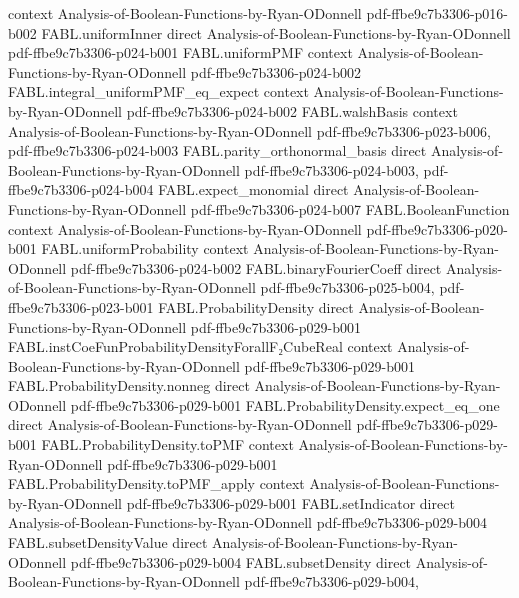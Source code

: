 \begin{theorem}
  {context}
  {Analysis-of-Boolean-Functions-by-Ryan-ODonnell}
  {pdf-ffbe9c7b3306-p016-b002}
\proofstep
  {FABL.uniformInner}
  {direct}
  {Analysis-of-Boolean-Functions-by-Ryan-ODonnell}
  {pdf-ffbe9c7b3306-p024-b001}
\proofstep
  {FABL.uniformPMF}
  {context}
  {Analysis-of-Boolean-Functions-by-Ryan-ODonnell}
  {pdf-ffbe9c7b3306-p024-b002}
\proofstep
  {FABL.integral_uniformPMF_eq_expect}
  {context}
  {Analysis-of-Boolean-Functions-by-Ryan-ODonnell}
  {pdf-ffbe9c7b3306-p024-b002}
\proofstep
  {FABL.walshBasis}
  {context}
  {Analysis-of-Boolean-Functions-by-Ryan-ODonnell}
  {pdf-ffbe9c7b3306-p023-b006,
    pdf-ffbe9c7b3306-p024-b003}
\proofstep
  {FABL.parity_orthonormal_basis}
  {direct}
  {Analysis-of-Boolean-Functions-by-Ryan-ODonnell}
  {pdf-ffbe9c7b3306-p024-b003,
    pdf-ffbe9c7b3306-p024-b004}
\proofstep
  {FABL.expect_monomial}
  {direct}
  {Analysis-of-Boolean-Functions-by-Ryan-ODonnell}
  {pdf-ffbe9c7b3306-p024-b007}
\proofstep
  {FABL.BooleanFunction}
  {context}
  {Analysis-of-Boolean-Functions-by-Ryan-ODonnell}
  {pdf-ffbe9c7b3306-p020-b001}
\proofstep
  {FABL.uniformProbability}
  {context}
  {Analysis-of-Boolean-Functions-by-Ryan-ODonnell}
  {pdf-ffbe9c7b3306-p024-b002}
\proofstep
  {FABL.binaryFourierCoeff}
  {direct}
  {Analysis-of-Boolean-Functions-by-Ryan-ODonnell}
  {pdf-ffbe9c7b3306-p025-b004,
    pdf-ffbe9c7b3306-p023-b001}
\proofstep
  {FABL.ProbabilityDensity}
  {direct}
  {Analysis-of-Boolean-Functions-by-Ryan-ODonnell}
  {pdf-ffbe9c7b3306-p029-b001}
\proofstep
  {FABL.instCoeFunProbabilityDensityForallF₂CubeReal}
  {context}
  {Analysis-of-Boolean-Functions-by-Ryan-ODonnell}
  {pdf-ffbe9c7b3306-p029-b001}
\proofstep
  {FABL.ProbabilityDensity.nonneg}
  {direct}
  {Analysis-of-Boolean-Functions-by-Ryan-ODonnell}
  {pdf-ffbe9c7b3306-p029-b001}
\proofstep
  {FABL.ProbabilityDensity.expect_eq_one}
  {direct}
  {Analysis-of-Boolean-Functions-by-Ryan-ODonnell}
  {pdf-ffbe9c7b3306-p029-b001}
\proofstep
  {FABL.ProbabilityDensity.toPMF}
  {context}
  {Analysis-of-Boolean-Functions-by-Ryan-ODonnell}
  {pdf-ffbe9c7b3306-p029-b001}
\proofstep
  {FABL.ProbabilityDensity.toPMF_apply}
  {context}
  {Analysis-of-Boolean-Functions-by-Ryan-ODonnell}
  {pdf-ffbe9c7b3306-p029-b001}
\proofstep
  {FABL.setIndicator}
  {direct}
  {Analysis-of-Boolean-Functions-by-Ryan-ODonnell}
  {pdf-ffbe9c7b3306-p029-b004}
\proofstep
  {FABL.subsetDensityValue}
  {direct}
  {Analysis-of-Boolean-Functions-by-Ryan-ODonnell}
  {pdf-ffbe9c7b3306-p029-b004}
\proofstep
  {FABL.subsetDensity}
  {direct}
  {Analysis-of-Boolean-Functions-by-Ryan-ODonnell}
  {pdf-ffbe9c7b3306-p029-b004,
}
\end{theorem}
